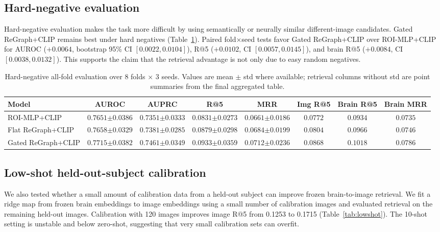 \documentclass{article}
\begin{document}
\subsection{Hard-negative evaluation}

Hard-negative evaluation makes the task more difficult by using semantically or neurally similar different-image candidates. Gated ReGraph+CLIP remains best under hard negatives (Table~\ref{tab:hardneg}). Paired fold$\times$seed tests favor Gated ReGraph+CLIP over ROI-MLP+CLIP for AUROC ($+0.0064$, bootstrap 95\% CI $[0.0022,0.0104]$), R@5 ($+0.0102$, CI $[0.0057,0.0145]$), and brain R@5 ($+0.0084$, CI $[0.0038,0.0132]$). This supports the claim that the retrieval advantage is not only due to easy random negatives.

\begin{table}[!htbp]
  \centering
  \caption{Hard-negative all-fold evaluation over 8 folds $\times$ 3 seeds. Values are mean $\pm$ std where available; retrieval columns without std are point summaries from the final aggregated table.}
  \label{tab:hardneg}
  \scriptsize
  \setlength{\tabcolsep}{3.5pt}
  \renewcommand{\arraystretch}{1.15}
  \begin{tabular}{lccccccc}
    \toprule
    Model & AUROC & AUPRC & R@5 & MRR & Img R@5 & Brain R@5 & Brain MRR \\
    \midrule
    ROI-MLP+CLIP & $0.7651{\scriptstyle\pm0.0386}$ & $0.7351{\scriptstyle\pm0.0333}$ & $0.0831{\scriptstyle\pm0.0273}$ & $0.0661{\scriptstyle\pm0.0186}$ & $0.0772$ & $0.0934$ & $0.0735$ \\
    Flat ReGraph+CLIP & $0.7658{\scriptstyle\pm0.0329}$ & $0.7381{\scriptstyle\pm0.0285}$ & $0.0879{\scriptstyle\pm0.0298}$ & $0.0684{\scriptstyle\pm0.0199}$ & $0.0804$ & $0.0966$ & $0.0746$ \\
    Gated ReGraph+CLIP & $\mathbf{0.7715{\scriptstyle\pm0.0382}}$ & $\mathbf{0.7461{\scriptstyle\pm0.0349}}$ & $\mathbf{0.0933{\scriptstyle\pm0.0359}}$ & $\mathbf{0.0712{\scriptstyle\pm0.0236}}$ & $\mathbf{0.0868}$ & $\mathbf{0.1018}$ & $\mathbf{0.0786}$ \\
    \bottomrule
  \end{tabular}
\end{table}

\subsection{Low-shot held-out-subject calibration}

We also tested whether a small amount of calibration data from a held-out subject can improve frozen brain-to-image retrieval. We fit a ridge map from frozen brain embeddings to image embeddings using a small number of calibration images and evaluated retrieval on the remaining held-out images. Calibration with 120 images improves image R@5 from 0.1253 to 0.1715 (Table~\ref{tab:lowshot}). The 10-shot setting is unstable and below zero-shot, suggesting that very small calibration sets can overfit.
\end{document}

